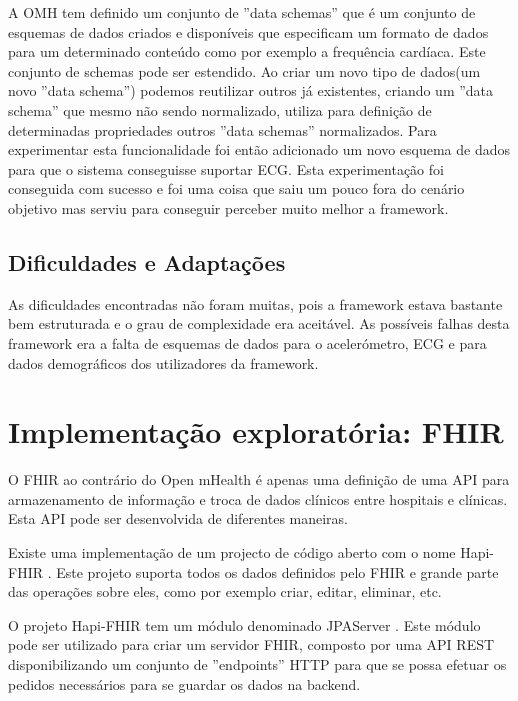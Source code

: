A \gls{OMH} tem definido um conjunto de ''data schemas'' \cite{omhschemas} que é um conjunto de esquemas de dados criados e disponíveis que especificam um formato de dados para um determinado conteúdo como por exemplo a frequência cardíaca\cite{omhschemas}. Este conjunto de schemas pode ser estendido. Ao criar um novo tipo de dados(um novo ''data schema'') podemos reutilizar outros já existentes, criando um ''data schema'' que mesmo não sendo normalizado, utiliza para definição de determinadas propriedades outros ''data schemas'' normalizados. Para experimentar esta funcionalidade foi então adicionado um novo esquema de dados para que o sistema conseguisse suportar \gls{ECG}. Esta experimentação foi conseguida com sucesso e foi uma coisa que saiu um pouco fora do cenário objetivo mas serviu para conseguir perceber muito melhor a framework. \par 

\subsection{Dificuldades e Adaptações}

As dificuldades encontradas não foram muitas, pois a framework estava bastante bem estruturada e o grau de complexidade era aceitável. As possíveis falhas desta framework era a falta de esquemas de dados para o acelerómetro, \gls{ECG} e para dados demográficos dos utilizadores da framework.

\section{Implementação exploratória: FHIR}
O \gls{FHIR} ao contrário do Open mHealth é apenas uma definição de uma \gls{API} para armazenamento de informação e troca de dados clínicos entre hospitais e clínicas. Esta \gls{API} pode ser desenvolvida de diferentes maneiras. \par 
Existe uma implementação de um projecto de código aberto com o nome Hapi-FHIR . Este projeto suporta todos os dados definidos pelo \gls{FHIR} e grande parte das operações sobre eles, como por exemplo criar, editar, eliminar, etc.
\par 
O projeto Hapi-FHIR tem um módulo denominado JPAServer  \cite{jpa-server}. Este módulo pode ser utilizado para criar um servidor FHIR, composto por uma \gls{API} \gls{REST} disponibilizando um conjunto de ''endpoints'' \gls{HTTP} para que se possa efetuar os pedidos necessários para se guardar os dados na backend. \par

